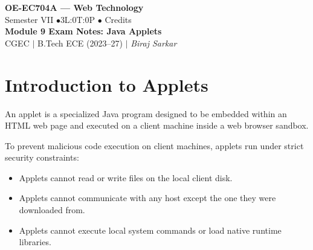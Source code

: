 \documentclass[12pt,a4paper]{article}
\begin{document}

\begin{center}
  {\LARGE\bfseries\color{myred} OE-EC704A --- Web Technology}\\[5pt]
  {\normalsize\color{mydark} Semester VII \quad$\bullet$\quad 3L:0T:0P \quad$\bullet$ Credits}\\[3pt]
  {\normalsize\color{myteal}\textbf{Module 9 Exam Notes: Java Applets}}\\[3pt]
  {\small\color{mydark} CGEC \;$|$\; B.Tech ECE (2023--27) \;$|$\; \textit{Biraj Sarkar}}
\end{center}
\noindent{\color{myred}\rule{\linewidth}{1.5pt}}
\vspace{2pt}

\hypersetup{linkcolor=mydark}
\tableofcontents
\hypersetup{linkcolor=myteal}
\newpage

\section{Introduction to Applets}

An applet is a specialized Java program designed to be embedded within an HTML web page and executed on a client machine inside a web browser sandbox.

\begin{tcolorbox}[defbox, title={\textbf{Applet Security Sandbox}}]
To prevent malicious code execution on client machines, applets run under strict security constraints:
\begin{itemize}[leftmargin=*, itemsep=3pt]
  \item Applets cannot read or write files on the local client disk.
  \item Applets cannot communicate with any host except the one they were downloaded from.
  \item Applets cannot execute local system commands or load native runtime libraries.
\end{itemize}
\end{tcolorbox}
\end{document}
